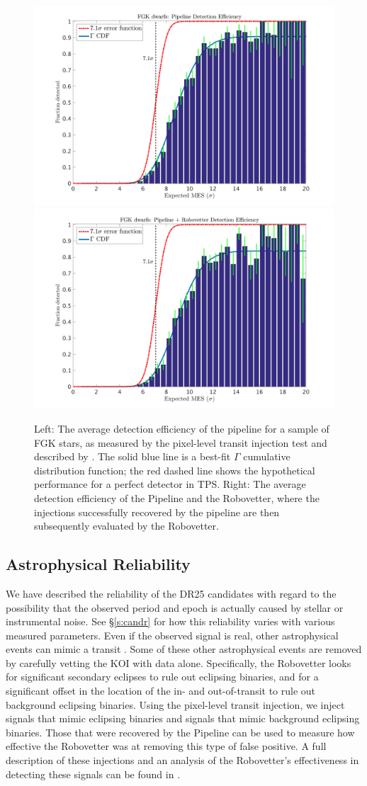 \begin{figure}[ht]

\centering

\includegraphics[width=0.45\linewidth]{fig-senscurvwithfits_withoutRv.png}
\includegraphics[width=0.45\linewidth]{fig-senscurvwithfits_withRv.png}

\caption{Left: The average detection efficiency of the pipeline for a sample of FGK stars, as measured by the pixel-level transit injection test and described by \citet{Christiansen2017}. The solid blue line is a best-fit $\Gamma$ cumulative distribution function; the red dashed line shows the hypothetical performance for a perfect detector in TPS. Right: The average detection efficiency of the \Kepler{} Pipeline and the Robovetter, where the injections successfully recovered by the pipeline are then subsequently evaluated by the Robovetter.}

\label{f:fulldetectionefficiency}

\end{figure}


\subsection{Astrophysical Reliability}
We have described the reliability of the DR25 candidates with regard to the possibility that the observed period and epoch is actually caused by stellar or instrumental noise. See \S\ref{s:candr} for how this reliability varies with various measured parameters.  Even if the observed signal is real, other astrophysical events can mimic a transit \citep[see e.g.][]{Morton2016}. Some of these other astrophysical events are removed by carefully vetting the KOI with \Kepler{} data alone.  Specifically, the Robovetter looks for significant secondary eclipses to rule out eclipsing binaries, and for a significant offset in the location of the in- and out-of-transit to rule out background eclipsing binaries. Using the pixel-level transit injection, we inject signals that mimic eclipsing binaries and signals that mimic background eclipsing binaries. Those that were recovered by the \Kepler{} Pipeline can be used to measure how effective the Robovetter was at removing this type of false positive. A full description of these injections and an analysis of the Robovetter's effectiveness in detecting these signals can be found in \citet{Coughlin2017a}.

